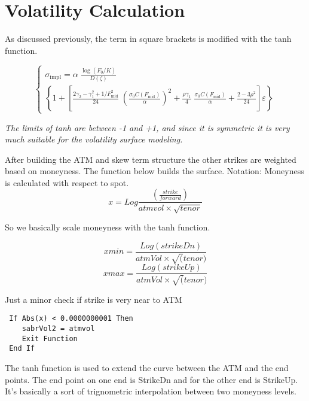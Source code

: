 \documentclass[a4paper, 12pt]{article}
\begin{document}
\section{Volatility Calculation}
\normalfont
As discussed previously, the term in square brackets is modified with the tanh function.

\begin{equation}
\begin{cases}
\sigma_{\text{impl}}=\alpha\;
\frac{\log\left(F_0/K\right)}{D\left(\zeta\right)}\; \\
\left\{1+\left[\frac{2\gamma_2-\gamma_1^2+1/F_{\text{mid}}^2}{24}\;\left(\frac{\sigma_0 C\left(F_{\text{mid}}\right)} {\alpha}\right)^2+ \frac{\rho\gamma_1}{4}\;\frac{\sigma_0 C\left(F_{\text{mid}}\right)}{\alpha}+\frac{2-3\rho^2}{24}
\right]\varepsilon\right\}
\end{cases}
\end{equation}

\emph{The limits of tanh are between -1 and +1, and since it is symmetric it is very much suitable for the volatility surface modeling.}

After building the ATM and skew term structure the other strikes are weighted based on moneyness. The function below builds the surface. 
Notation: 
Moneyness is calculated with respect to spot. 
\begin{equation}
x = Log\frac{(\frac{strike}{forward})}{atmvol \times \sqrt{tenor}}
\end{equation}


So we basically scale moneyness with the tanh function. 

\begin{equation}
xmin = \frac{Log(strikeDn)}{atmVol \times \sqrt(tenor)}
\end{equation}
\begin{equation}
xmax = \frac{Log(strikeUp)}{atmVol \times \sqrt(tenor)} 
\end{equation}

Just a minor check if strike is very near to ATM \\
\begin{lstlisting}
 If Abs(x) < 0.0000000001 Then 
    sabrVol2 = atmvol 
    Exit Function 
 End If
\end{lstlisting}  

The tanh function is used to extend the curve between the ATM and the end points. The end point on one end is StrikeDn and for the other end is StrikeUp. It's basically a sort of trignometric interpolation between two moneyness levels.
\end{document}
